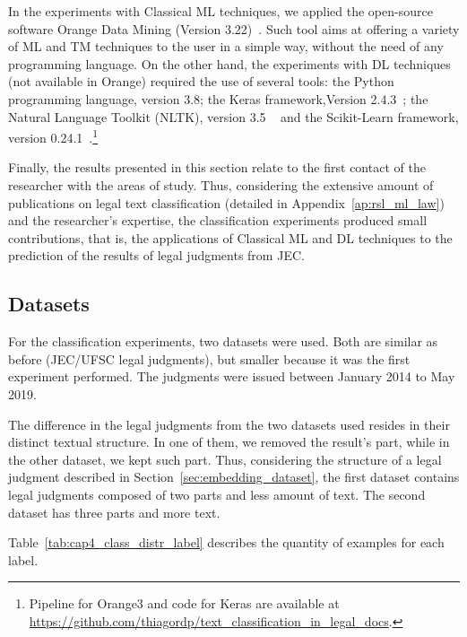 In the experiments with Classical \gls{ML} techniques, we applied the open-source software Orange Data Mining (Version 3.22)~\cite{Demsar13}. Such tool aims at offering a variety of \gls{ML} and \gls{TM} techniques to the user in a simple way, without the need of any programming language. On the other hand, the experiments with \gls{DL} techniques (not available in Orange) required the use of several tools: the Python programming language, version 3.8; the Keras framework,Version 2.4.3~\cite{Chollet2015}; the Natural Language Toolkit (NLTK), version 3.5 ~\cite{Loper02} and the Scikit-Learn framework, version 0.24.1~\cite{Pedregosa2012}.\footnote{Pipeline for Orange3 and code for Keras are available at \url{https://github.com/thiagordp/text_classification_in_legal_docs}.}


Finally, the results presented in this section relate to the first contact of the researcher with the areas of study. Thus, considering the extensive amount of publications on legal text classification (detailed in Appendix~\ref{ap:rsl_ml_law}) and the researcher's expertise, the classification experiments produced small contributions, that is, the applications of Classical \gls{ML} and \gls{DL} techniques to the prediction of the results of legal judgments from \gls{JEC}.


\subsection{Datasets}

For the classification experiments, two datasets were used. Both are similar as before (JEC/UFSC legal judgments), but smaller because it was the first experiment performed. The judgments were issued between  January 2014 to May 2019.

The difference in the legal judgments from the two datasets used resides in their distinct textual structure.  In one of them, we removed the result's part, while in the other dataset,  we kept such part. Thus, considering the structure of a legal judgment described in Section~\ref{sec:embedding_dataset}, the first dataset contains legal judgments composed of two parts and less amount of text. The second dataset has three parts and more text.

Table~\ref{tab:cap4_class_distr_label} describes the quantity of examples for each label. 

